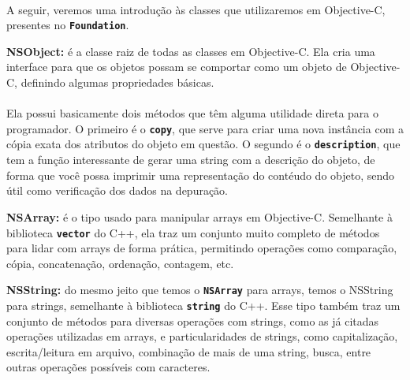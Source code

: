 \documentclass[a4paper,12pt,brazil,doubleside]{book}
\begin{document}
\begin{singlespace}
\paragraph{}A seguir, veremos uma introdução às classes que utilizaremos em Objective-C, presentes no \texttt{\textbf{Foundation}}.

\bigskip

\begin{description}
\item{\textbf{NSObject:} é a classe raiz de todas as classes em Objective-C. Ela cria uma interface para que os objetos possam se comportar como um objeto de Objective-C, definindo algumas propriedades básicas.
\paragraph{}Ela possui basicamente dois métodos que têm alguma utilidade direta para o programador. O primeiro é o \texttt{\textbf{copy}}, que serve para criar uma nova instância com a cópia exata dos atributos do objeto em questão. O segundo é o \texttt{\textbf{description}}, que tem a função interessante de gerar uma string com a descrição do objeto, de forma que você possa imprimir uma representação do contéudo do objeto, sendo útil como verificação dos dados na depuração.}

\item{\textbf{NSArray:} é o tipo usado para manipular arrays em Objective-C. Semelhante à biblioteca \texttt{\textbf{vector}} do C++, ela traz um conjunto muito completo de métodos para lidar com arrays de forma prática, permitindo operações como comparação, cópia, concatenação, ordenação, contagem, etc.}

\item{\textbf{NSString:} do mesmo jeito que temos o \texttt{\textbf{NSArray}} para arrays, temos o NSString para strings, semelhante à biblioteca \texttt{\textbf{string}} do C++. Esse tipo também traz um conjunto de métodos para diversas operações com strings, como as já citadas operações utilizadas em arrays, e particularidades de strings, como capitalização, escrita/leitura em arquivo, combinação de mais de uma string, busca, entre outras operações possíveis com caracteres.}


\end{description}
\end{singlespace}
\end{document}
